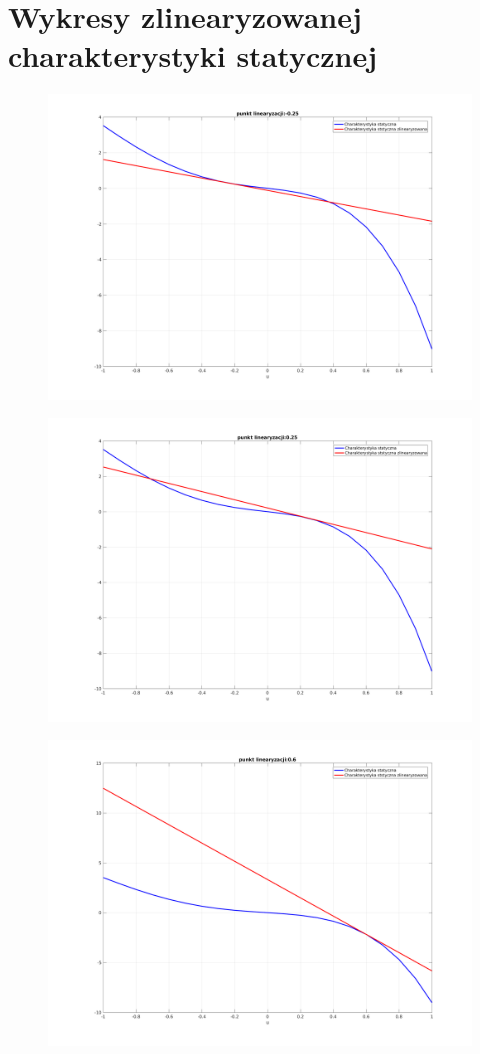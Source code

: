 \documentclass[a4paper, 11pt]{article}
\begin{document}
\section{Wykresy zlinearyzowanej charakterystyki statycznej}
\begin{figure}[H]
\centering
\includegraphics[scale=0.45]{6_-0,25.png}
\end{figure}
\begin{figure}[H]
\centering
\includegraphics[scale=0.45]{6_0,25.png}
\end{figure}
\begin{figure}[H]
\centering
\includegraphics[scale=0.45]{6_0,6.png}
\end{figure}
\end{document}
